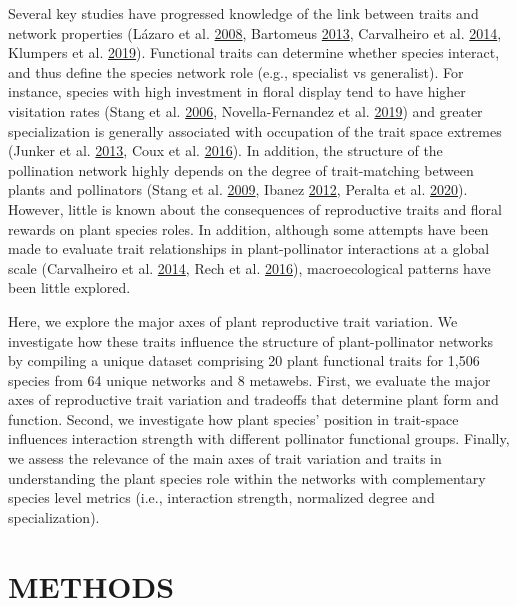 \documentclass[12pt,a4paper,]{article}
\begin{document}
Several key studies have progressed knowledge of the link between traits
and network properties (Lázaro et al.
\protect\hyperlink{ref-lazaro2008}{2008}, Bartomeus
\protect\hyperlink{ref-bartomeus2013}{2013}, Carvalheiro et al.
\protect\hyperlink{ref-carvalheiro2014}{2014}, Klumpers et al.
\protect\hyperlink{ref-klumpers2019}{2019}). Functional traits can
determine whether species interact, and thus define the species network
role (e.g., specialist vs generalist). For instance, species with high
investment in floral display tend to have higher visitation rates (Stang
et al. \protect\hyperlink{ref-stang2006}{2006}, Novella-Fernandez et al.
\protect\hyperlink{ref-novella-fernandez2019}{2019}) and greater
specialization is generally associated with occupation of the trait
space extremes (Junker et al. \protect\hyperlink{ref-junker2013}{2013},
Coux et al. \protect\hyperlink{ref-coux2016}{2016}). In addition, the
structure of the pollination network highly depends on the degree of
trait-matching between plants and pollinators (Stang et al.
\protect\hyperlink{ref-stang2009}{2009}, Ibanez
\protect\hyperlink{ref-ibanez2012}{2012}, Peralta et al.
\protect\hyperlink{ref-peralta2020}{2020}). However, little is known
about the consequences of reproductive traits and floral rewards on
plant species roles. In addition, although some attempts have been made
to evaluate trait relationships in plant-pollinator interactions at a
global scale (Carvalheiro et al.
\protect\hyperlink{ref-carvalheiro2014}{2014}, Rech et al.
\protect\hyperlink{ref-rech2016}{2016}), macroecological patterns have
been little explored.

Here, we explore the major axes of plant reproductive trait variation.
We investigate how these traits influence the structure of
plant-pollinator networks by compiling a unique dataset comprising 20
plant functional traits for 1,506 species from 64 unique networks and 8
metawebs. First, we evaluate the major axes of reproductive trait
variation and tradeoffs that determine plant form and function. Second,
we investigate how plant species' position in trait-space influences
interaction strength with different pollinator functional groups.
Finally, we assess the relevance of the main axes of trait variation and
traits in understanding the plant species role within the networks with
complementary species level metrics (i.e., interaction strength,
normalized degree and specialization).

\section{METHODS}\label{methods}
\end{document}
